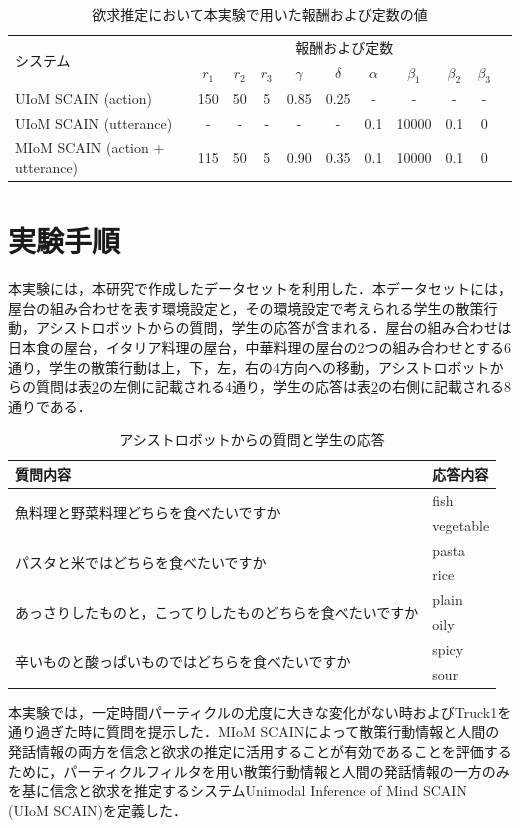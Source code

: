 \begin{table}[htb]
  \begin{center}
  \caption{欲求推定において本実験で用いた報酬および定数の値}
  \label{d_params}
  \begin{tabular}{lcccccccccc} \hline
    \multirow{2}{*}{システム}&\multicolumn{9}{c}{報酬および定数}\\\cline{2-10}
    & $r_1$& $r_2$&$r_3$&$\gamma$&$\delta$&$\alpha$&$\beta_1$&$\beta_2$&$\beta_3$\\ \hline
    UIoM SCAIN (action)&150&50&5&0.85&0.25&-&-&-&-\\
    UIoM SCAIN (utterance)&-&-&-&-&-&0.1&10000&0.1&0\\
    MIoM SCAIN (action + utterance)&115&50&5&0.90&0.35&0.1&10000&0.1&0\\\hline
  \end{tabular}
\end{center}
\end{table}

\section{実験手順}

\par
本実験には，本研究で作成したデータセットを利用した．本データセットには，屋台の組み合わせを表す環境設定と，その環境設定で考えられる学生の散策行動，アシストロボットからの質問，学生の応答が含まれる．屋台の組み合わせは日本食の屋台，イタリア料理の屋台，中華料理の屋台の2つの組み合わせとする6通り，学生の散策行動は上，下，左，右の4方向への移動，アシストロボットからの質問は表\ref{tab:q_a}の左側に記載される4通り，学生の応答は表\ref{tab:q_a}の右側に記載される8通りである．
\begin{table}[htb]
  \begin{center}
  \caption{アシストロボットからの質問と学生の応答}
  \label{tab:q_a}
  \begin{tabular}{ll} \hline
    質問内容&応答内容\\\hline
    \multirow{2}{*}{魚料理と野菜料理どちらを食べたいですか}&fish\\
    &vegetable\\
    \multirow{2}{*}{パスタと米ではどちらを食べたいですか}&pasta\\
    &rice\\
    \multirow{2}{*}{あっさりしたものと，こってりしたものどちらを食べたいですか}&plain\\
    &oily\\
    \multirow{2}{*}{辛いものと酸っぱいものではどちらを食べたいですか}&spicy\\
    &sour\\\hline
  \end{tabular}
\end{center}
\end{table}
本実験では，一定時間パーティクルの尤度に大きな変化がない時およびTruck1を通り過ぎた時に質問を提示した．MIoM SCAINによって散策行動情報と人間の発話情報の両方を信念と欲求の推定に活用することが有効であることを評価するために，パーティクルフィルタを用い散策行動情報と人間の発話情報の一方のみを基に信念と欲求を推定するシステムUnimodal Inference of Mind SCAIN (UIoM SCAIN)を定義した．


